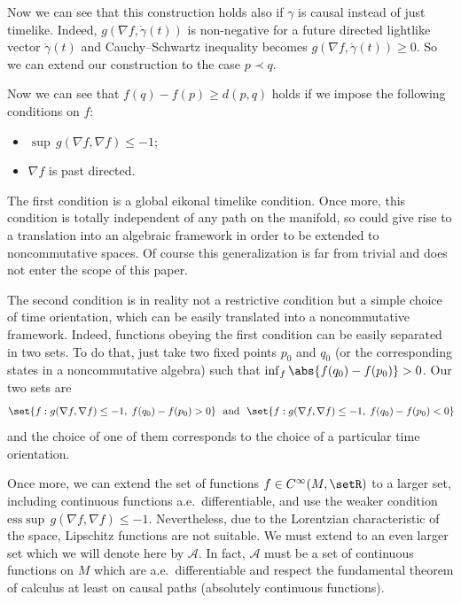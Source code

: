 Now we can see that this construction holds also if $\gamma$ is causal instead of just timelike. Indeed, $g( \nabla f,\dot\gamma(t))$ is non-negative for a future directed lightlike vector $\dot\gamma(t)$ and Cauchy--Schwartz inequality becomes $g( \nabla f,\dot\gamma(t)) \geq 0$. So we can extend our construction to the case $p \prec q$.

Now we can see that $f(q) - f(p) \geq d(p,q)$ holds if we impose the following conditions on $f$:
\begin{itemize}\itemsep=0pt
\item  $\sup\, g( \nabla f, \nabla f ) \leq -1$;
\item $\nabla f$ is past directed.
\end{itemize}

The f\/irst condition is a global eikonal timelike condition. Once more, this condition is totally independent of any path on the manifold, so could give rise to a translation into an algebraic framework in order to be extended to noncommutative spaces. Of course this generalization is far from trivial and does not enter the scope of this paper.

The second condition is in reality not a restrictive condition but a simple choice of time orientation, which can be easily translated into a noncommutative framework. Indeed, functions obeying the f\/irst condition can be easily separated in two sets. To do that, just take two f\/ixed points $p_0$ and $q_0$ (or the corresponding states in a noncommutative algebra) such that $\inf_f \abs{ f(q_0) -f(p_0) } > 0$. Our two sets are
\begin{gather*}
\set{ f : g( \nabla f, \nabla f ) \leq -1,\; f(q_0) - f(p_0) > 0}\!\!\quad\text{and}\quad\!\!  \set{ f : g( \nabla f, \nabla f ) \leq -1,\; f(q_0) - f(p_0) < 0}\!
\end{gather*}
 and the choice of one of them corresponds to the choice of a particular time orientation.

Once more, we can extend the set of functions $f \in C^\infty(M,\setR)$ to a larger set, including continuous functions a.e.\ dif\/ferentiable, and use the weaker condition $\text{ess}\sup\, g( \nabla f, \nabla f ) \leq -1$. Nevertheless, due to the Lorentzian characteristic of the space, Lipschitz functions are not suitable. We must extend to an even larger set which we will denote here by $\mathcal A$. In fact, $\mathcal A$ must be a set of continuous functions on $M$ which are a.e.\ dif\/ferentiable and respect the fundamental theorem of calculus at least on causal paths (absolutely continuous functions).

